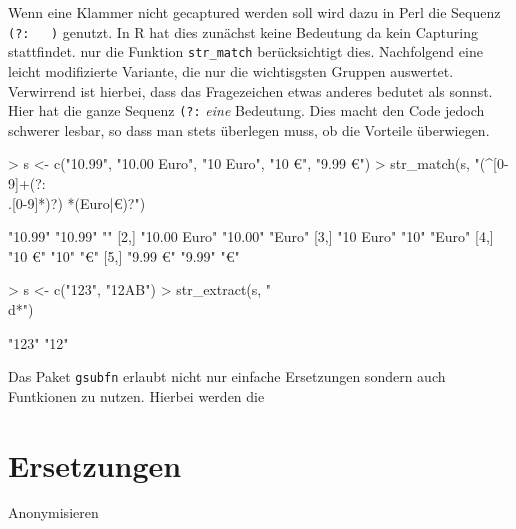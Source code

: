\documentclass[a4paper]{report}
\newcommand{\R}{{\sffamily R}}
\begin{document}
Wenn eine Klammer nicht gecaptured werden soll wird dazu in Perl die Sequenz \verb!(?:   )! genutzt. In \R{} hat dies zunächst keine Bedeutung da kein Capturing stattfindet. nur die Funktion \verb!str_match! berücksichtigt dies. Nachfolgend eine leicht modifizierte Variante, die nur die wichtisgsten Gruppen auswertet. Verwirrend ist hierbei, dass das Fragezeichen etwas anderes bedutet als sonnst. Hier hat die ganze Sequenz \verb!(?:! \emph{eine} Bedeutung. Dies macht den Code jedoch schwerer lesbar, so dass man stets überlegen muss, ob die Vorteile überwiegen.

\begin{Schunk}
\begin{Sinput}
> s <- c("10.99", "10.00 Euro", "10  Euro", "10 €", "9.99 €")
> str_match(s, "(^[0-9]+(?:\\.[0-9]*)?) *(Euro|€)?")
\end{Sinput}
\begin{Soutput}
     [,1]         [,2]    [,3]  
[1,] "10.99"      "10.99" ""    
[2,] "10.00 Euro" "10.00" "Euro"
[3,] "10  Euro"   "10"    "Euro"
[4,] "10 €"       "10"    "€"   
[5,] "9.99 €"     "9.99"  "€"   
\end{Soutput}
\end{Schunk}


\begin{Schunk}
\begin{Sinput}
> s <- c("123", "12AB")
> str_extract(s, "\\d*")
\end{Sinput}
\begin{Soutput}
[1] "123" "12" 
\end{Soutput}
\end{Schunk}

Das Paket \texttt{gsubfn} erlaubt nicht nur einfache Ersetzungen sondern auch Funtkionen zu nutzen. Hierbei werden die 

\section{Ersetzungen}

Anonymisieren 
\end{document}
